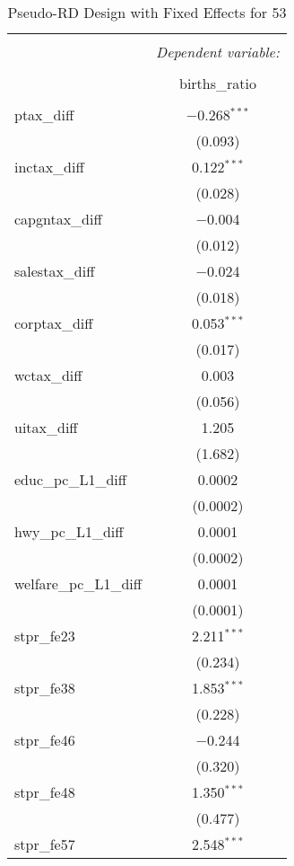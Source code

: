 
\begin{table}[!htbp] \centering 
  \caption{Pseudo-RD Design with Fixed Effects for  53} 
  \label{} 
\begin{tabular}{@{\extracolsep{5pt}}lc} 
\\[-1.8ex]\hline 
\hline \\[-1.8ex] 
 & \multicolumn{1}{c}{\textit{Dependent variable:}} \\ 
\cline{2-2} 
\\[-1.8ex] & births\_ratio \\ 
\hline \\[-1.8ex] 
 ptax\_diff & $-$0.268$^{***}$ \\ 
  & (0.093) \\ 
  inctax\_diff & 0.122$^{***}$ \\ 
  & (0.028) \\ 
  capgntax\_diff & $-$0.004 \\ 
  & (0.012) \\ 
  salestax\_diff & $-$0.024 \\ 
  & (0.018) \\ 
  corptax\_diff & 0.053$^{***}$ \\ 
  & (0.017) \\ 
  wctax\_diff & 0.003 \\ 
  & (0.056) \\ 
  uitax\_diff & 1.205 \\ 
  & (1.682) \\ 
  educ\_pc\_L1\_diff & 0.0002 \\ 
  & (0.0002) \\ 
  hwy\_pc\_L1\_diff & 0.0001 \\ 
  & (0.0002) \\ 
  welfare\_pc\_L1\_diff & 0.0001 \\ 
  & (0.0001) \\ 
  stpr\_fe23 & 2.211$^{***}$ \\ 
  & (0.234) \\ 
  stpr\_fe38 & 1.853$^{***}$ \\ 
  & (0.228) \\ 
  stpr\_fe46 & $-$0.244 \\ 
  & (0.320) \\ 
  stpr\_fe48 & 1.350$^{***}$ \\ 
  & (0.477) \\ 
  stpr\_fe57 & 2.548$^{***}$ \\ 

\end{tabular}
\end{table}
